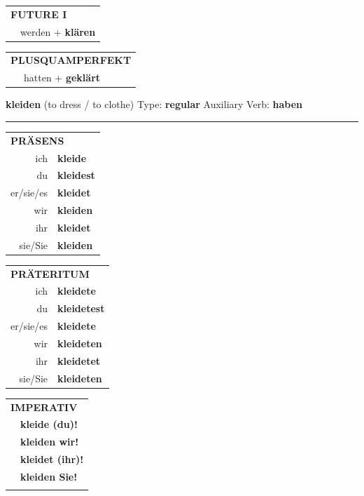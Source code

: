 \documentclass[10pt,a4paper]{revtex4-2}
\begin{document}
\begin{verbbox-acc}
\begin{tabular}{rl}
    \multicolumn{2}{l}{\textbf{FUTURE I} }\\
   & werden + \textbf{klären}\\
 
  \end{tabular}
\hfill
   \begin{tabular}{rl}
      \multicolumn{2}{l}{\textbf{PLUSQUAMPERFEKT}}\\
   & hatten + \textbf{geklärt}\\
  \end{tabular}
  
  \vspace{-5pt}


\end{verbbox-acc}

\begin{verbbox}
    {\Large \bf kleiden} (to dress / to clothe) \hfill Type: \textbf{regular} \hfill Auxiliary Verb: \textbf{haben} 
    
     \vspace{5pt}

    \hrule
    
    \vspace{5pt}

  \begin{tabular}{rl}
     \multicolumn{2}{l}{\textbf{PRÄSENS} }\\
    ich & \textbf{kleide}\\
    du & \textbf{kleidest}\\
    er/sie/es & \textbf{kleidet}\\
    wir & \textbf{kleiden}\\
    ihr & \textbf{kleidet}\\
    sie/Sie & \textbf{kleiden}\\
  \end{tabular}
  \hfill
     \begin{tabular}{rl}
    \multicolumn{2}{l}{\textbf{PRÄTERITUM} }\\
    ich & \textbf{kleidete}\\
    du & \textbf{kleidetest}\\
    er/sie/es & \textbf{kleidete}\\
    wir & \textbf{kleideten}\\
    ihr & \textbf{kleidetet}\\
    sie/Sie & \textbf{kleideten}\\
  \end{tabular}
  \hfill
  \begin{tabular}{rl}
     \multicolumn{2}{l}{\textbf{IMPERATIV} }\\
   & \textbf{kleide (du)!}\\
   & \textbf{kleiden wir!}\\
   & \textbf{kleidet (ihr)!}\\
   & \textbf{kleiden Sie!}\\
   & \vspace{10pt}
  \end{tabular}


\end{verbbox}
\end{document}
